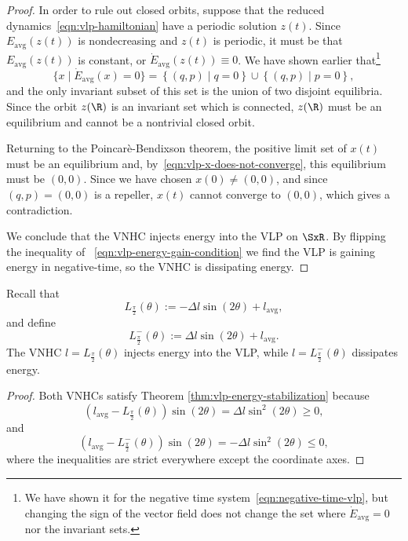 \begin{proof}
In order to rule out closed orbits, suppose that the reduced
dynamics~\eqref{eqn:vlp-hamiltonian} have a periodic solution \( z(t)\). 
Since \( E_\text{avg}(z(t)) \) is nondecreasing and \(z(t)\)
is periodic, it must be that \( E_\text{avg}(z(t)) \) is constant, or
\(\dot E_\text{avg}(z(t)) \equiv 0\). 
We have shown earlier
that\footnote{We have shown it for the negative time
system~\eqref{eqn:negative-time-vlp}, but changing the sign of the
vector field does not change the set where 
\(\dot E_\text{avg} =0\) nor the invariant sets.}
\[
   \{x \mid \dot E_\text{avg}(x) = 0\} = \left\{(q,p) \mid q = 0\right\}
   \cup \left\{(q,p) \mid p =0\right\},
\]
and the only invariant subset of this set is the union of two disjoint
equilibria. 
Since the orbit \(z(\R)\) is an invariant set which is
connected, \(z(\R)\) must be an equilibrium and cannot be a nontrivial
closed orbit.

Returning to the Poincar\`e-Bendixson theorem, the positive limit set
of \( x(t)\) must be an equilibrium and,
by~\eqref{eqn:vlp-x-does-not-converge}, this equilibrium must be 
\( (0,0)\). 
Since we have chosen \(x(0) \neq (0,0)\), and since \( (q,p) = (0,0) \) is a
repeller, \( x(t) \) cannot converge to \( (0,0)\), which gives a contradiction.

We conclude that the VNHC injects energy into the VLP on 
\(\SxR\).
By flipping the inequality of ~\eqref{eqn:vlp-energy-gain-condition}
we find the VLP is gaining energy in negative-time, so the VNHC is
dissipating energy.
\end{proof}

\begin{cor}
   Recall that
   \[
      L_\frac{\pi}{2}(\theta) := -\Delta l \sin(2\theta) + l_\text{avg}
      ,
   \]
   and define 
   \[
      L^{-}_\frac{\pi}{2}(\theta) := \Delta l \sin(2\theta) + l_\text{avg}
      .
   \]
   The VNHC \(l = L_\frac{\pi}{2}(\theta)\) injects energy into the VLP,
   while \(l = L^{-}_\frac{\pi}{2}(\theta)\) dissipates energy.
\end{cor}
\begin{proof}
   Both VNHCs satisfy Theorem \ref{thm:vlp-energy-stabilization} because
   \[
      \left(l_\text{avg} - L_\frac{\pi}{2}(\theta)\right)\sin(2\theta) = 
      \Delta l \sin^2(2\theta) \geq 0
      ,
   \] 
   and
   \[
      \left(l_\text{avg} - L^{-}_\frac{\pi}{2}(\theta)\right)\sin(2\theta) = 
      - \Delta l \sin^2(2\theta) \leq 0
      ,
   \] 
   where the inequalities are strict everywhere except the coordinate axes.
\end{proof}

